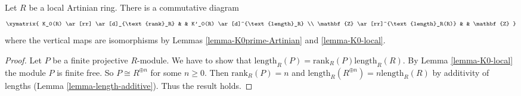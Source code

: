 \begin{lemma}
\label{lemma-K0-and-K0prime-Artinian-local}
Let $R$ be a local Artinian ring. There is a commutative
diagram
$$
\xymatrix{
K_0(R) \ar[rr] \ar[d]_{\text{rank}_R} & &
K'_0(R) \ar[d]^{\text{length}_R} \\
\mathbf{Z} \ar[rr]^{\text{length}_R(R)} & &
\mathbf{Z}
}
$$
where the vertical maps are isomorphisms by
Lemmas \ref{lemma-K0prime-Artinian} and \ref{lemma-K0-local}.
\end{lemma}

\begin{proof}
Let $P$ be a finite projective $R$-module. We have to show that
$\text{length}_R(P) = \text{rank}_R(P) \text{length}_R(R)$.
By Lemma \ref{lemma-K0-local} the module $P$ is finite free. So
$P \cong R^{\oplus n}$ for some $n \geq 0$. Then $\text{rank}_R(P) = n$ and
$\text{length}_R(R^{\oplus n}) = n \text{length}_R(R)$
by additivity of lengths (Lemma \ref{lemma-length-additive}).
Thus the result holds.
\end{proof}

















